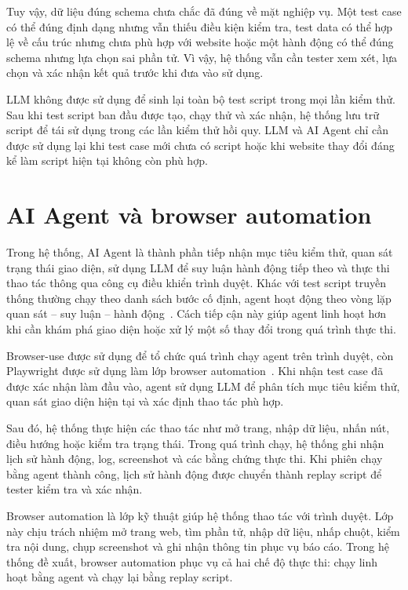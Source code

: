 Tuy vậy, dữ liệu đúng schema chưa chắc đã đúng về mặt nghiệp vụ. Một test case có thể đúng định dạng nhưng vẫn thiếu điều kiện kiểm tra, test data có thể hợp lệ về cấu trúc nhưng chưa phù hợp với website hoặc một hành động có thể đúng schema nhưng lựa chọn sai phần tử. Vì vậy, hệ thống vẫn cần tester xem xét, lựa chọn và xác nhận kết quả trước khi đưa vào sử dụng.

LLM không được sử dụng để sinh lại toàn bộ test script trong mọi lần kiểm thử. Sau khi test script ban đầu được tạo, chạy thử và xác nhận, hệ thống lưu trữ script để tái sử dụng trong các lần kiểm thử hồi quy. LLM và AI Agent chỉ cần được sử dụng lại khi test case mới chưa có script hoặc khi website thay đổi đáng kể làm script hiện tại không còn phù hợp.

\section{AI Agent và browser automation}

Trong hệ thống, AI Agent là thành phần tiếp nhận mục tiêu kiểm thử, quan sát trạng thái giao diện, sử dụng LLM để suy luận hành động tiếp theo và thực thi thao tác thông qua công cụ điều khiển trình duyệt. Khác với test script truyền thống thường chạy theo danh sách bước cố định, agent hoạt động theo vòng lặp quan sát -- suy luận -- hành động~\cite{browseruse2026}. Cách tiếp cận này giúp agent linh hoạt hơn khi cần khám phá giao diện hoặc xử lý một số thay đổi trong quá trình thực thi.

Browser-use được sử dụng để tổ chức quá trình chạy agent trên trình duyệt, còn Playwright được sử dụng làm lớp browser automation~\cite{browseruse2026,playwright_docs}. Khi nhận test case đã được xác nhận làm đầu vào, agent sử dụng LLM để phân tích mục tiêu kiểm thử, quan sát giao diện hiện tại và xác định thao tác phù hợp.

Sau đó, hệ thống thực hiện các thao tác như mở trang, nhập dữ liệu, nhấn nút, điều hướng hoặc kiểm tra trạng thái. Trong quá trình chạy, hệ thống ghi nhận lịch sử hành động, log, screenshot và các bằng chứng thực thi. Khi phiên chạy bằng agent thành công, lịch sử hành động được chuyển thành replay script để tester kiểm tra và xác nhận.

Browser automation là lớp kỹ thuật giúp hệ thống thao tác với trình duyệt. Lớp này chịu trách nhiệm mở trang web, tìm phần tử, nhập dữ liệu, nhấp chuột, kiểm tra nội dung, chụp screenshot và ghi nhận thông tin phục vụ báo cáo. Trong hệ thống đề xuất, browser automation phục vụ cả hai chế độ thực thi: chạy linh hoạt bằng agent và chạy lại bằng replay script.

